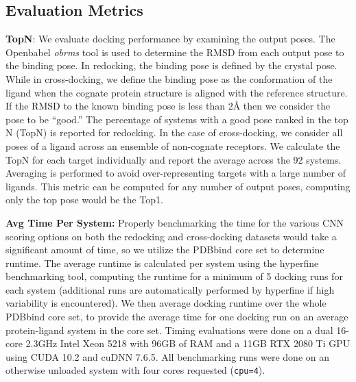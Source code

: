 \documentclass[journal=jcisd8,manuscript=article]{achemso}
\begin{document}
\subsection{Evaluation Metrics}

\textbf{TopN}: We evaluate docking performance by examining the output poses. The Openbabel \textit{obrms} tool\cite{babelopen,o2011open} is used to determine the RMSD from each output pose to the binding pose. In redocking, the binding pose is defined by the crystal pose. While in cross-docking, we define the binding pose as the conformation of the ligand when the cognate protein structure is aligned with the reference structure. If the RMSD to the known binding pose is less than 2{\AA} then we consider the pose to be ``good.'' The percentage of systems with a good pose ranked in the top N (TopN)  is reported for redocking. In the case of cross-docking, we consider all poses of a ligand across an ensemble of non-cognate receptors.  We calculate the TopN for each target individually and report the average across the 92 systems. Averaging is performed to avoid over-representing targets with a large number of ligands. This metric can be computed for any number of output poses, computing only the top pose would be the Top1.

\textbf{Avg Time Per System:}
Properly benchmarking the time for the various CNN scoring options on both the redocking and cross-docking datasets would take a significant amount of time, so we utilize the PDBbind core set to determine runtime. The average runtime is calculated per system using the hyperfine benchmarking tool\cite{hyperfine}, computing the runtime for a minimum of 5 docking runs for each system (additional runs are automatically performed by hyperfine if high variability is encountered). We then average docking runtime over the whole PDBbind core set, to provide the average time for one docking run on an average protein-ligand system in the core set. Timing evaluations were done on a dual 16-core 2.3GHz Intel Xeon 5218 with 96GB of RAM and a 11GB RTX 2080 Ti GPU using CUDA 10.2 and cuDNN 7.6.5. All benchmarking runs were done on an otherwise unloaded system with four cores requested (\texttt{cpu=4}).
\end{document}
